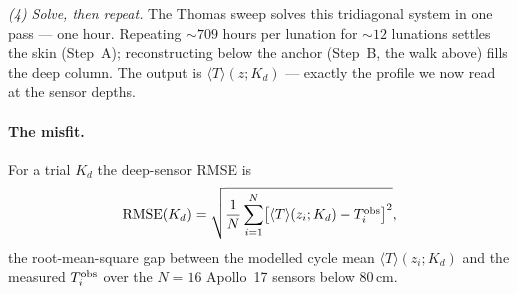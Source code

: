 \documentclass[11pt]{report}
\newcommand{\Tm}{\langle T\rangle}
\begin{document}
\emph{(4) Solve, then repeat.} The Thomas sweep solves this tridiagonal system in one pass
--- one hour. Repeating ${\sim}709$ hours per lunation for ${\sim}12$ lunations settles the
skin (Step~A); reconstructing below the anchor (Step~B, the walk above) fills the deep
column. The output is $\Tm(z;K_d)$ --- exactly the profile we now read at the sensor depths.

\paragraph{The misfit.} For a trial $K_d$ the deep-sensor RMSE is
\[
\mathrm{RMSE}(K_d)=\sqrt{\frac1N\sum_{i=1}^{N}\bigl[\Tm(z_i;K_d)-T^{\rm obs}_i\bigr]^2},
\]
the root-mean-square gap between the modelled cycle mean $\Tm(z_i;K_d)$ and the measured
$T^{\rm obs}_i$ over the $N=16$ Apollo~17 sensors below $80$\,cm.
\end{document}

